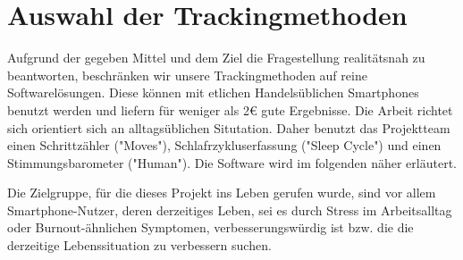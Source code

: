 \section{Auswahl der Trackingmethoden}
\label{ch:Einleitung:sec:auswahl-der-trackingmethoden}

Aufgrund der gegeben Mittel und dem Ziel die Fragestellung realitätsnah zu beantworten, beschränken wir unsere Trackingmethoden auf reine Softwarelösungen. Diese können mit etlichen Handelsüblichen Smartphones benutzt werden und liefern für weniger als 2\euro{} gute Ergebnisse. Die Arbeit richtet sich orientiert sich an alltagsüblichen Situtation. Daher benutzt das Projektteam einen Schrittzähler ("Moves"), Schlafrzykluserfassung ("Sleep Cycle") und einen Stimmungsbarometer ("Human").
Die Software wird im folgenden näher erläutert.

Die Zielgruppe, für die dieses Projekt ins Leben gerufen wurde, sind vor allem Smartphone-Nutzer, deren derzeitiges Leben, sei es durch Stress im Arbeitsalltag oder Burnout-ähnlichen Symptomen, verbesserungswürdig ist bzw. die die derzeitige Lebenssituation zu verbessern suchen.  

